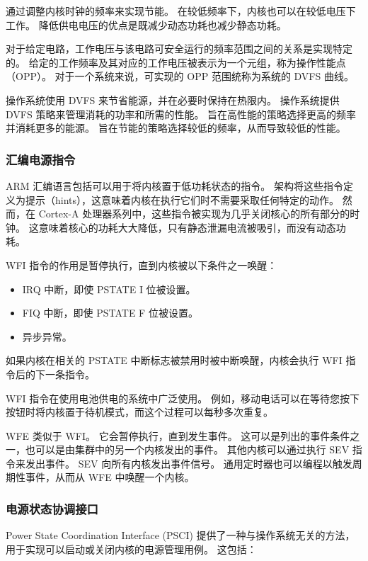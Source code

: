通过调整内核时钟的频率来实现节能。
在较低频率下，内核也可以在较低电压下工作。
降低供电电压的优点是既减少动态功耗也减少静态功耗。

对于给定电路，工作电压与该电路可安全运行的频率范围之间的关系是实现特定的。
给定的工作频率及其对应的工作电压被表示为一个元组，称为操作性能点（OPP）。
对于一个系统来说，可实现的 OPP 范围统称为系统的 DVFS 曲线。

操作系统使用 DVFS 来节省能源，并在必要时保持在热限内。
操作系统提供 DVFS 策略来管理消耗的功率和所需的性能。
旨在高性能的策略选择更高的频率并消耗更多的能源。
旨在节能的策略选择较低的频率，从而导致较低的性能。

\subsubsection{汇编电源指令}

ARM 汇编语言包括可以用于将内核置于低功耗状态的指令。
架构将这些指令定义为提示（hints），这意味着内核在执行它们时不需要采取任何特定的动作。
然而，在 Cortex-A 处理器系列中，这些指令被实现为几乎关闭核心的所有部分的时钟。
这意味着核心的功耗大大降低，只有静态泄漏电流被吸引，而没有动态功耗。

WFI 指令的作用是暂停执行，直到内核被以下条件之一唤醒：

\begin{itemize}
\item
  IRQ 中断，即使 PSTATE I 位被设置。
\item
  FIQ 中断，即使 PSTATE F 位被设置。
\item
  异步异常。
\end{itemize}

如果内核在相关的 PSTATE 中断标志被禁用时被中断唤醒，内核会执行 WFI 指令后的下一条指令。

WFI 指令在使用电池供电的系统中广泛使用。
例如，移动电话可以在等待您按下按钮时将内核置于待机模式，而这个过程可以每秒多次重复。

WFE 类似于 WFI。
它会暂停执行，直到发生事件。
这可以是列出的事件条件之一，也可以是由集群中的另一个内核发出的事件。
其他内核可以通过执行 SEV 指令来发出事件。
SEV 向所有内核发出事件信号。
通用定时器也可以编程以触发周期性事件，从而从 WFE 中唤醒一个内核。

\subsubsection{电源状态协调接口}

Power State Coordination Interface (PSCI) 提供了一种与操作系统无关的方法，用于实现可以启动或关闭内核的电源管理用例。
这包括：


